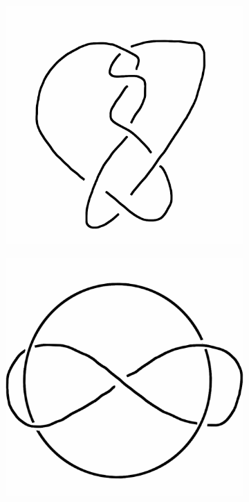 \documentclass[12pt,letterpaper]{article}
\theoremstyle{definition}
\begin{document}
\begin{figure}[h]
    \centering
    \begin{subfigure}{.3\textwidth}
        \centering
        \includegraphics[width=\textwidth]{knotpics/ex1.png}
    \end{subfigure}
    \quad
    \begin{subfigure}{.3\textwidth}
        \centering
        \includegraphics[width=\textwidth]{knotpics/ex2.png}

\end{subfigure}
\end{figure}
\end{document}
